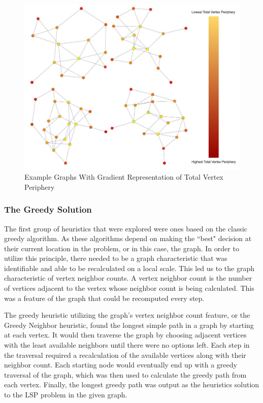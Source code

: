 \documentclass[twocolumn,showpacs,%
  nofootinbib,aps,superscriptaddress,%
  eqsecnum,prd,notitlepage,showkeys,11pt]{article}
\begin{document}
\begin{figure}
    \centering
    \includegraphics[width=\linewidth]{GraphTVPGradientsExamples.jpg}
    \caption{Example Graphs With Gradient Representation of Total Vertex Periphery}
    \label{fig:GraphTVPGradient}
\end{figure}

\subsubsection{The Greedy Solution}
The first group of heuristics that were explored were ones based on the classic greedy algorithm. As these algorithms depend on making the ``best" decision at their current location in the problem, or in this case, the graph. In order to utilize this principle, there needed to be a graph characteristic that was identifiable and able to be recalculated on a local scale. This led us to the graph characteristic of vertex neighbor counts. A vertex neighbor count is the number of vertices adjacent to the vertex whose neighbor count is being calculated. This was a feature of the graph that could be recomputed every step. 

The greedy heuristic utilizing the graph's vertex neighbor count feature, or the Greedy Neighbor heuristic, found the longest simple path in a graph by starting at each vertex. It would then traverse the graph by choosing adjacent vertices with the least available neighbors until there were no options left. Each step in the traversal required a recalculation of the available vertices along with their neighbor count. Each starting node would eventually end up with a greedy traversal of the graph, which was then used to calculate the greedy path from each vertex. Finally, the longest greedy path was output as the heuristics solution to the LSP problem in the given graph.
\end{document}
